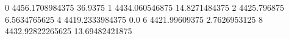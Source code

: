 0 4456.1708984375 36.9375
1 4434.060546875 14.8271484375
2 4425.796875 6.5634765625
4 4419.2333984375 0.0
6 4421.99609375 2.7626953125
8 4432.92822265625 13.69482421875
